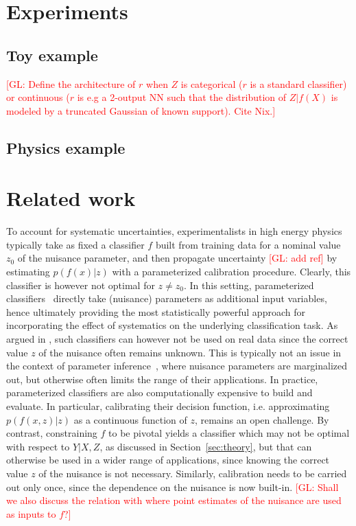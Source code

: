 \documentclass[twocolumn,superscriptaddress,aps]{revtex4-1}
\newcommand{\glnote}[1]{\textcolor{red}{[GL: #1]}}
\theoremstyle{plain}
\begin{document}

\section{Experiments}

\subsection{Toy example}

\glnote{Define the architecture of $r$ when $Z$ is categorical ($r$ is a
standard classifier) or continuous ($r$ is e.g a 2-output NN such that the
distribution of $Z|f(X)$ is modeled by a truncated Gaussian of known support). Cite Nix.}

\subsection{Physics example}



\section{Related work}

To account for systematic uncertainties, experimentalists in high energy physics
typically take as fixed a classifier $f$ built from training data for a nominal
value $z_0$ of the nuisance parameter, and then propagate uncertainty
\glnote{add ref} by estimating $p(f(x)|z)$ with a parameterized calibration
procedure. Clearly, this classifier is however not optimal for $z \neq z_0$. In
this setting, parameterized
classifiers~\citep{cranmer2015approximating,Baldi:2016fzo} directly take
(nuisance) parameters as additional input variables, hence ultimately providing
the most statistically powerful approach for incorporating the effect of
systematics on the underlying classification task.  As argued in
\citep{Neal:2007zz}, such classifiers can however not be used on real data since
the correct value $z$ of the nuisance often remains unknown. This is typically
not an issue in the context of parameter
inference~\citep{cranmer2015approximating}, where nuisance parameters are
marginalized out, but otherwise often limits the range of their applications. In
practice, parameterized classifiers  are also computationally expensive to build
and evaluate. In particular, calibrating their decision function, i.e.
approximating $p(f(x,z)|z)$ as a continuous function of $z$, remains an open
challenge. By contrast, constraining $f$ to be pivotal yields a classifier which
may not be optimal with respect to $Y|X,Z$, as discussed in
Section~\ref{sec:theory}, but that can otherwise be used in a wider range of
applications, since knowing the correct value $z$ of the nuisance is not
necessary. Similarly, calibration needs to be carried out only once, since  the
dependence on the nuisance is now built-in. \glnote{Shall we also discuss the
relation with \citep{Neal:2007zz} where point estimates of the nuisance are used
as inputs to $f$?}
\end{document}
